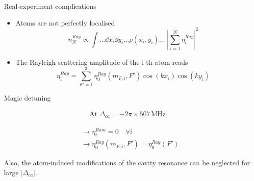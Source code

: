 \documentclass{beamer}
\begin{document}
\begin{frame}{Real-experiment complications}
	\begin{itemize}
		\item Atoms are not perfectly localised
		\vspace{-1em}
		\begin{equation*}
			n^{Ray}_N \propto \int...\dd{x_i}\dd{y_i}... \rho(x_i,y_i)...\; |\sum_{i=1}^N \eta^{Ray}_i|^2
		\end{equation*}
		\item The Rayleigh scattering amplitude of the i-th atom reads
		\vspace{-1em}
		\begin{equation*}
			\eta^{Ray}_i = \sum_{F'=1}^3\eta^{Ray}_0(m_{F,i},F')\cos(kx_i)\cos(ky_i)
		\end{equation*}
	\end{itemize}
\end{frame}

\begin{frame}{Magic detuning}
	\begin{minipage}{\textwidth}
		\hspace{3em}
		\begin{minipage}{0.1\textwidth}
			\begin{align*}
				\text{At }\Delta_{ca}=-2\pi\times507\,\text{MHz}
			\end{align*}
		\end{minipage}
		\hspace{-1em}
		\begin{minipage}{0.49\textwidth}
			\begin{align*}
				&\longrightarrow \eta^{Ram}_i=0 \quad\forall i\\
				&\longrightarrow \eta^{Ray}_0(m_{F,i},F')=\eta^{Ray}_0(F')
				\end{align*}
		\end{minipage}
	\end{minipage}
	\vfill
	Also, the atom-induced modifications of the cavity resonance can be neglected for large $|\Delta_{ca}|$.
	\vfill
\end{frame}
\end{document}
